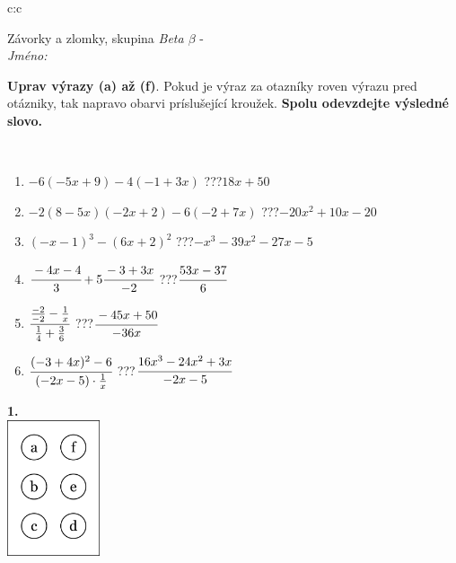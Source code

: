 \documentclass[10pt]{report}
\begin{document}
\begin{tabular}{c:c}
\begin{minipage}[c][104.5mm][t]{0.5\linewidth}
\begin{center}
\vspace{7mm}
{\huge Závorky a zlomky, skupina \textit{Beta $\beta$} -}\\[5mm]
\textit{Jméno:}\phantom{xxxxxxxxxxxxxxxxxxxxxxxxxxxxxxxxxxxxxxxxxxxxxxxxxxxxxxxxxxxxxxxxx}\\[5mm]
\begin{minipage}{0.95\linewidth}
\begin{center}
\textbf{Uprav výrazy (a) až (f)}. Pokud je výraz za otazníky roven výrazu pred otázniky, tak napravo obarvi príslušející kroužek. \textbf{Spolu odevzdejte výsledné slovo.}
\end{center}
\end{minipage}
\\[1mm]
\begin{minipage}{0.79\linewidth}
\begin{center}
\begin{varwidth}{\linewidth}
\begin{enumerate}
\normalsize
\item $-6(-5x+9)-4(-1+3x)$\quad \dotfill\; ???\;\dotfill \quad $18x+50$
\item $-2(8-5x)(-2x+2)-6(-2+7x)$\quad \dotfill\; ???\;\dotfill \quad $-20x^2+10x-20$
\item $(-x-1)^3-(6x+2)^2$\quad \dotfill\; ???\;\dotfill \quad $-x^3-39x^2-27x-5$
\item $\cfrac{-4x-4}{3}+5\cfrac{-3+3x}{-2}$\quad \dotfill\; ???\;\dotfill \quad $\cfrac{53x-37}{6}$
\item $\cfrac{\frac{-2}{-2}-\frac{1}{x}}{\frac{1}{4}+\frac{3}{6}}$\quad \dotfill\; ???\;\dotfill \quad $\cfrac{-45x+50}{-36x}$
\item $\cfrac{(-3+4x)^2-6}{(-2x-5)\cdot\frac{1}{x}}$\quad \dotfill\; ???\;\dotfill \quad $\cfrac{16x^3-24x^2+3x}{-2x-5}$
\end{enumerate}
\end{varwidth}
\end{center}
\end{minipage}
\begin{minipage}{0.20\linewidth}
\begin{center}
{\Huge\bfseries 1.} \\[2mm]
\includegraphics[height=40mm]{../images/braille.png}

\end{center}
\end{minipage}
\end{center}
\end{minipage}
\end{tabular}
\end{document}
